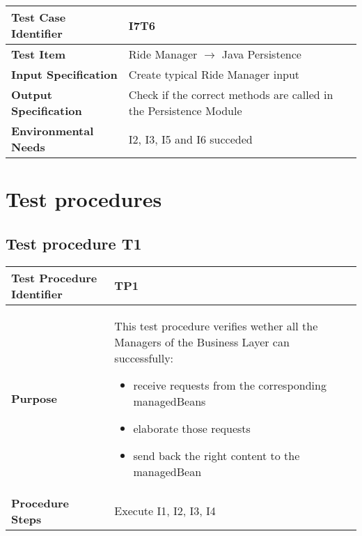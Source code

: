 \begin{table}[!htbp]
\begin{center}
\begin{tabular}[t]{p{}p{}}

\hline
\textbf{Test Case Identifier} & I7T6 \\
\hline
\textbf{Test Item} & Ride Manager $\rightarrow$ Java Persistence \\
\hline
\textbf{Input Specification} & Create typical Ride Manager input \\
\hline
\textbf{Output Specification} & Check if the correct methods are called in the Persistence Module \\
\hline
\textbf{Environmental Needs} & I2, I3, I5 and I6 succeded \\
\hline

\end{tabular}
\end{center}
\end{table}
\clearpage



\section{Test procedures}

\subsection{Test procedure T1}

\begin{table}[!htbp]
\begin{center}
\begin{tabular}[t]{p{}p{}}

\hline
\textbf{Test Procedure Identifier} & TP1 \\
\hline
\textbf{Purpose} & This test procedure verifies wether all the Managers of the Business Layer can successfully:
\begin{itemize}
	\item receive requests from the corresponding managedBeans
	\item elaborate those requests
	\item send back the right content to the managedBean
\end{itemize} \\
\hline
\textbf{Procedure Steps} & Execute I1, I2, I3, I4 \\
\hline

\end{tabular}
\end{center}
\end{table}


